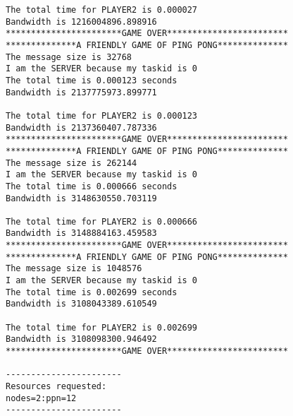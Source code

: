 \documentclass[11pt]{article}
\begin{document}
\begin{enumerate}
\begin{center}
\begin{lstlisting}
The total time for PLAYER2 is 0.000027
Bandwidth is 1216004896.898916
***********************GAME OVER************************
**************A FRIENDLY GAME OF PING PONG**************
The message size is 32768
I am the SERVER because my taskid is 0
The total time is 0.000123 seconds
Bandwidth is 2137775973.899771

The total time for PLAYER2 is 0.000123
Bandwidth is 2137360407.787336
***********************GAME OVER************************
**************A FRIENDLY GAME OF PING PONG**************
The message size is 262144
I am the SERVER because my taskid is 0
The total time is 0.000666 seconds
Bandwidth is 3148630550.703119

The total time for PLAYER2 is 0.000666
Bandwidth is 3148884163.459583
***********************GAME OVER************************
**************A FRIENDLY GAME OF PING PONG**************
The message size is 1048576
I am the SERVER because my taskid is 0
The total time is 0.002699 seconds
Bandwidth is 3108043389.610549

The total time for PLAYER2 is 0.002699
Bandwidth is 3108098300.946492
***********************GAME OVER************************

-----------------------
Resources requested:
nodes=2:ppn=12
-----------------------

\end{lstlisting}
\end{center}
\end{enumerate}
\end{document}
